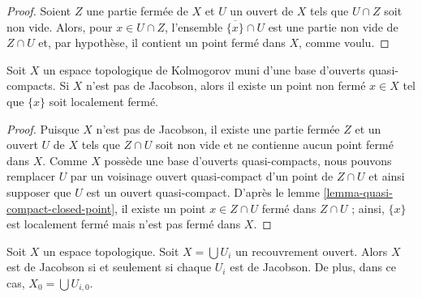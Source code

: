 \begin{proof}
Soient $Z$ une partie fermée de $X$
et $U$ un ouvert de $X$
tels que $U\cap Z$ soit non vide.
Alors, pour $x\in U\cap Z$, l'ensemble $\overline{\{x\}}\cap U$ est une partie
non vide de $Z\cap U$
et, par hypothèse, il contient un point fermé dans $X$, comme voulu.
\end{proof}

\begin{lemma}
\label{lemma-non-jacobson-Noetherian-characterize}
Soit $X$ un espace topologique de Kolmogorov muni d'une base d'ouverts
quasi-compacts.
Si $X$ n'est pas de Jacobson, alors il existe un point non fermé
$x \in X$ tel que $\{x\}$ soit localement fermé.
\end{lemma}

\begin{proof}
Puisque $X$ n'est pas de Jacobson, il existe une partie fermée $Z$ et un ouvert $U$
de $X$ tels que $Z \cap U$ soit non vide et ne contienne aucun point fermé
dans $X$. Comme $X$ possède une base d'ouverts quasi-compacts, nous pouvons
remplacer $U$
par un voisinage ouvert quasi-compact d'un point de $Z\cap U$ et ainsi supposer
que $U$ est un ouvert quasi-compact. D'après le
lemme \ref{lemma-quasi-compact-closed-point}, il existe un point
$x \in Z \cap U$ fermé dans $Z \cap U$ ;
ainsi, $\{x\}$ est localement fermé mais n'est pas fermé dans $X$.
\end{proof}

\begin{lemma}
\label{lemma-jacobson-local}
Soit $X$ un espace topologique.
Soit $X = \bigcup U_i$ un recouvrement ouvert.
Alors $X$ est de Jacobson si et seulement si chaque $U_i$ est de Jacobson.
De plus, dans ce cas, $X_0 = \bigcup U_{i, 0}$.
\end{lemma}

